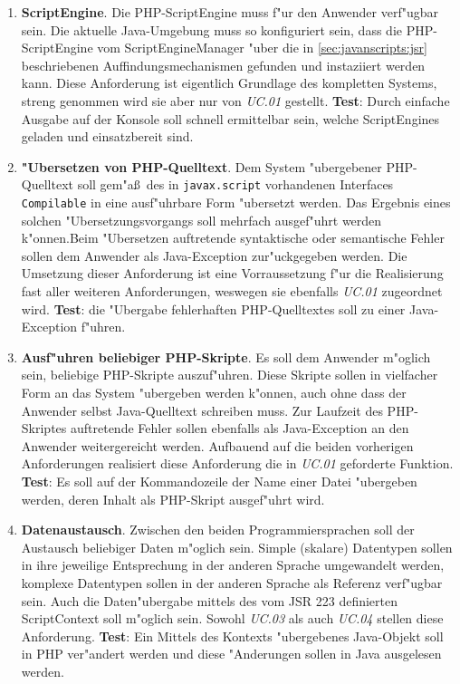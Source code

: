 \begin{enumerate}
\item \textbf{ScriptEngine}.
    Die PHP-ScriptEngine muss f"ur den Anwender verf"ugbar sein. Die aktuelle Java-Umgebung muss so konfiguriert sein,
    dass die PHP-ScriptEngine vom ScriptEngineManager "uber die in \ref{sec:javanscripts:jsr} beschriebenen Auffindungsmechanismen
    gefunden und instaziiert werden kann. Diese Anforderung ist eigentlich Grundlage des kompletten Systems, streng genommen wird sie
    aber nur von \emph{UC.01} gestellt.
    \textbf{Test}: Durch einfache Ausgabe auf der Konsole soll schnell ermittelbar sein, welche ScriptEngines geladen und einsatzbereit sind.

\item \textbf{"Ubersetzen von PHP-Quelltext}. Dem System "ubergebener PHP-Quelltext soll gem"a\ss\ des in \texttt{javax.script} vorhandenen 
    Interfaces \texttt{Compilable} in eine ausf"uhrbare Form "ubersetzt werden. Das Ergebnis eines solchen "Ubersetzungsvorgangs
    soll mehrfach ausgef"uhrt werden k"onnen.Beim "Ubersetzen auftretende syntaktische oder semantische Fehler sollen dem Anwender 
    als Java-Exception zur"uckgegeben werden.
    Die Umsetzung dieser Anforderung ist eine Vorraussetzung f"ur die Realisierung fast aller weiteren Anforderungen, 
    weswegen sie ebenfalls \emph{UC.01} zugeordnet wird.
    \textbf{Test}: die "Ubergabe fehlerhaften PHP-Quelltextes soll zu einer Java-Exception f"uhren.

\item \textbf{Ausf"uhren beliebiger PHP-Skripte}. Es soll dem Anwender m"oglich sein, beliebige PHP-Skripte auszuf"uhren. Diese Skripte sollen
    in vielfacher Form an das System "ubergeben werden k"onnen, auch ohne dass der Anwender selbst Java-Quelltext schreiben muss.
    Zur Laufzeit des PHP-Skriptes auftretende Fehler sollen ebenfalls als Java-Exception an den Anwender weitergereicht werden.
    Aufbauend auf die beiden vorherigen Anforderungen realisiert diese Anforderung die in \emph{UC.01} geforderte Funktion.
    \textbf{Test}: Es soll auf der Kommandozeile der Name einer Datei "ubergeben werden, deren Inhalt als PHP-Skript ausgef"uhrt wird.

\item \textbf{Datenaustausch}. Zwischen den beiden Programmiersprachen soll der Austausch beliebiger Daten m"oglich sein. Simple (skalare)
    Datentypen sollen in ihre jeweilige Entsprechung in der anderen Sprache umgewandelt werden, komplexe Datentypen sollen in der anderen 
    Sprache als Referenz verf"ugbar sein. Auch die Daten"ubergabe mittels des vom JSR 223 definierten ScriptContext soll m"oglich sein.
    Sowohl \emph{UC.03} als auch \emph{UC.04} stellen diese Anforderung. 
    \textbf{Test}: Ein Mittels des Kontexts "ubergebenes Java-Objekt soll in PHP ver"andert werden und diese "Anderungen sollen in
    Java ausgelesen werden.


\end{enumerate}
